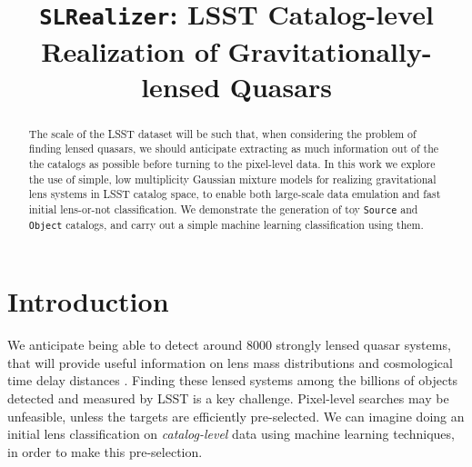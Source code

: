 \documentclass[\docopts]{\docclass}
\def\SLRealizer{\texttt{SLRealizer}\xspace}
\def\Object{\texttt{Object}\xspace}
\def\Source{\texttt{Source}\xspace}
\begin{document}
\title{\SLRealizer: LSST Catalog-level Realization of Gravitationally-lensed Quasars }

\maketitlepre

\begin{abstract}

The scale of the LSST dataset will be such that, when considering the
problem of finding lensed quasars, we should anticipate extracting as
much information out of the the catalogs as possible before turning to
the pixel-level data. In this work we explore the use of simple, low
multiplicity Gaussian mixture models for realizing gravitational lens
systems in LSST catalog space, to enable both large-scale data
emulation and fast initial lens-or-not classification. We demonstrate
the generation of toy \Source and \Object catalogs, and carry out a
simple machine learning classification using them.

\end{abstract}


\maketitlepost


\section{Introduction}
\label{sec:intro}


We anticipate being able to detect around 8000 strongly lensed quasar
systems, that will provide useful information on lens mass distributions
and cosmological time delay distances \citep{TM16,Twinkles}.
Finding these lensed systems among the billions of objects detected and
measured by LSST \citep{LSSTScienceBookv2} is a key challenge.
Pixel-level searches \citep[e.g.\ ]{RINGFINDER} may be unfeasible,
unless the targets are efficiently pre-selected.  We can imagine doing
an initial lens classification on {\it catalog-level} data using machine
learning techniques, in order to make this pre-selection.
\end{document}

